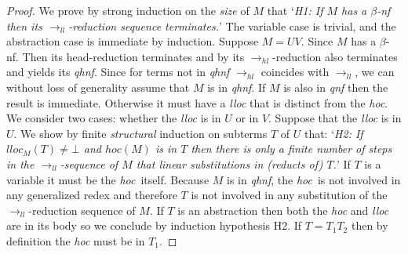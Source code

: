 \documentclass[xchauthor,chkrefs,GCNS,amsmath,amsthm,rotating,leaveRGB]{tcsg}
\theoremstyle{plain}
\theoremstyle{definition}
\newcommand{\hlred}{\rightarrow_{hl}}
\newcommand{\llred}{\rightarrow_{ll}}
\newcommand{\hoc}{\emph{hoc}}
\begin{document}
\begin{proof}
We prove by strong induction on the \emph{size} of $M$ that `\emph{H1: If $M$
has a $\beta $-nf then its $\llred $-reduction sequence terminates.}' The
variable case is trivial, and the abstraction case is immediate by induction.
Suppose $M = U V$. Since $M$ has a $\beta $-nf. Then its head-reduction
terminates and by  its
$\hlred $-reduction also terminates and yields its \emph{qhnf}. Since for
terms not in \emph{qhnf} $\hlred $ coincides with $\llred $, we can without
loss of generality assume that $M$ is in \emph{qhnf}. If $M$ is also in
\emph{qnf} then the result is immediate. Otherwise it must have a \emph{lloc}
that is distinct from the \emph{hoc}. We consider two cases: whether the
\emph{lloc} is in $U$ or in $V$. Suppose that the \emph{lloc} is in $U$. We
show by finite \emph{structural} induction on subterms $T$ of $U$ that:
`\emph{H2: If $lloc_{M}(T) \neq \bot $ and $hoc(M)$ is in $T$ then there is
only a finite number of steps in the $\llred $-sequence of $M$ that 
linear substitutions in (reducts of) $T$.}' If $T$ is a variable it must be
the \hoc~itself. Because $M$ is in \emph{qhnf}, the \hoc~is not involved in
any generalized redex and therefore $T$ is not involved in any substitution
of the $\llred $-reduction sequence of $M$. If $T$ is an abstraction then
both the \emph{hoc} and \emph{lloc} are in its body so we conclude by
induction hypothesis H2. If $T = T_{1} T_{2}$ then by definition the
\emph{hoc} must be in $T_{1}$.


\end{proof}
\end{document}
